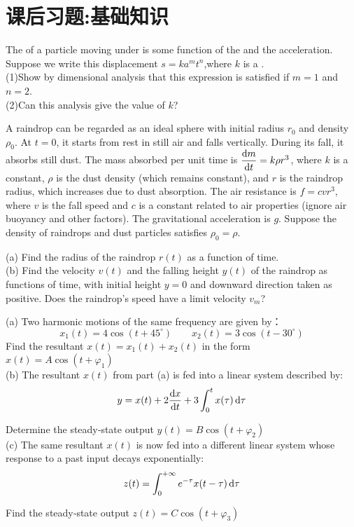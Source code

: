 \section{课后习题:基础知识}

\begin{example}
    The  of a particle moving under  is some function of the  and
    the acceleration. Suppose we write this displacement
    $s=ka^mt^n$,where $k$ is a . \\
    (1)Show by
    dimensional analysis that this expression is satisfied if
    $m = 1$ and $n = 2$. \\
    (2)Can this analysis give the value of $k$?
\end{example}

\begin{example}
    A raindrop can be regarded as an ideal sphere with initial radius $r_0$ and density $\rho_0$. At $t = 0$, it starts from rest in still air and falls vertically. During its fall, it absorbs still dust. The mass absorbed per unit time is $\dfrac{\dif m}{\dif t} = k\rho r^3$, where $k$ is a constant, $\rho$ is the dust density (which remains constant), and $r$ is the raindrop radius, which increases due to dust absorption. The air resistance is $f = cv r^3$, where $v$ is the fall speed and $c$ is a constant related to air properties (ignore air buoyancy and other factors). The gravitational acceleration is $g$. Suppose the density of raindrops and dust particles satisfies $\rho_0 = \rho$.

    (a) Find the radius of the raindrop $r(t)$ as a function of time.\\
    (b) Find the velocity $v(t)$ and the falling height $y(t)$ of the raindrop as functions of time, with initial height $y = 0$ and downward direction taken as positive. Does the raindrop's speed have a limit velocity $v_m$?\\
\end{example}

\begin{example}
    (a) Two harmonic motions of the same frequency are given by：
    \[x_1(t) = 4\cos(t + 45^\circ)\qquad x_2(t) = 3\cos(t-30^\circ)\]
    Find the resultant $x(t) = x_1(t) + x_2(t)$ in the form $x(t) = A\cos(t + \varphi_1)$\\
    (b) The resultant $x(t)$ from part (a) is fed into a linear system described by:
    \[y = x(t) + 2\dfrac{\dif x}{\dif t} + 3\int_{0}^{t} x(\tau)\dif \tau\]

    Determine the steady‑state output $y(t) = B\cos(t + \varphi_2)$\\
    (c) The same resultant $x(t)$ is now fed into a different linear system whose response to a past input decays exponentially:
    \[z(t) = \int_{0}^{+\infty} e^{-\tau} x(t-\tau)\dif \tau\]

    Find the steady‑state output $z(t) = C\cos(t + \varphi_3)$
\end{example}